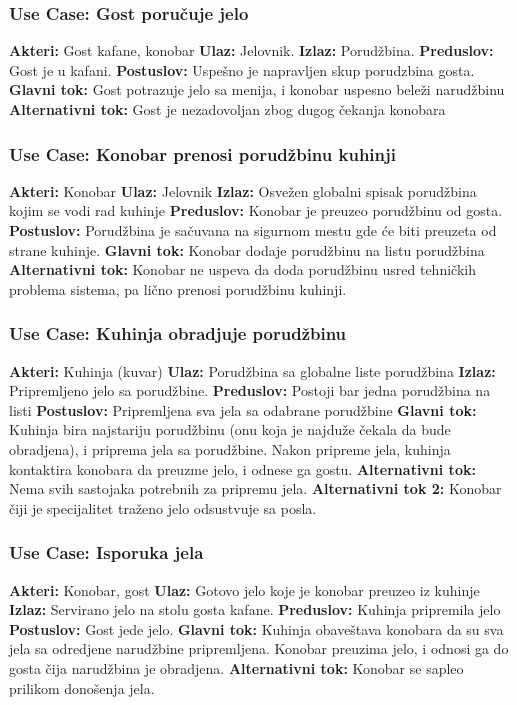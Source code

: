 \documentclass{article}
\begin{document}
\subsubsection{\textbf{Use Case}: Gost poručuje jelo}
\textbf{Akteri:} Gost kafane, konobar
\textbf{Ulaz:} Jelovnik.
\textbf{Izlaz:} Porudžbina.
\textbf{Preduslov:} Gost je u kafani.
\textbf{Postuslov:} Uspešno je napravljen skup porudzbina gosta.
\textbf{Glavni tok:} Gost potrazuje jelo sa menija, i konobar uspesno beleži narudžbinu
\textbf{Alternativni tok:} Gost je nezadovoljan zbog dugog čekanja konobara

\subsubsection{\textbf{Use Case:} Konobar prenosi porudžbinu kuhinji}
\textbf{Akteri:} Konobar
\textbf{Ulaz:} Jelovnik
\textbf{Izlaz:} Osvežen globalni spisak porudžbina kojim se vodi rad kuhinje
\textbf{Preduslov:} Konobar je preuzeo porudžbinu od gosta.
\textbf{Postuslov:} Porudžbina je sačuvana na sigurnom mestu gde će biti preuzeta od strane kuhinje.
\textbf{Glavni tok:} Konobar dodaje porudžbinu na listu porudžbina
\textbf{Alternativni tok:} Konobar ne uspeva da doda porudžbinu usred tehničkih problema sistema, pa lično prenosi porudžbinu kuhinji.

\subsubsection{\textbf{Use Case:} Kuhinja obradjuje porudžbinu}
\textbf{Akteri:} Kuhinja (kuvar)
\textbf{Ulaz:} Porudžbina sa globalne liste porudžbina
\textbf{Izlaz:} Pripremljeno jelo sa porudžbine.
\textbf{Preduslov:} Postoji bar jedna porudžbina na listi
\textbf{Postuslov:} Pripremljena sva jela sa odabrane porudžbine
\textbf{Glavni tok:} Kuhinja bira najstariju porudžbinu (onu koja je najduže čekala da bude obradjena), i priprema jela sa porudžbine. Nakon pripreme jela, kuhinja kontaktira konobara da preuzme jelo, i odnese ga gostu.
\textbf{Alternativni tok:} Nema svih sastojaka potrebnih za pripremu jela.
\textbf{Alternativni tok 2:} Konobar čiji je specijalitet traženo jelo odsustvuje sa posla.


\subsubsection{\textbf{Use Case:} Isporuka jela}
\textbf{Akteri:} Konobar, gost
\textbf{Ulaz:} Gotovo jelo koje je konobar preuzeo iz kuhinje
\textbf{Izlaz:} Servirano jelo na stolu gosta kafane.
\textbf{Preduslov:} Kuhinja pripremila jelo
\textbf{Postuslov:} Gost jede jelo.
\textbf{Glavni tok:} Kuhinja obaveštava konobara da su sva jela sa odredjene narudžbine pripremljena. Konobar preuzima jelo, i odnosi ga do gosta čija narudžbina je obradjena.
\textbf{Alternativni tok:} Konobar se sapleo prilikom donošenja jela.
\end{document}
